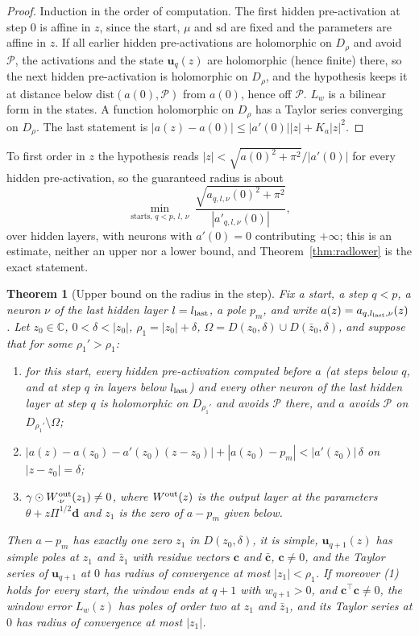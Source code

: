 \documentclass[11pt]{article}
\newtheorem{theorem}{Theorem}
\theoremstyle{definition}
\theoremstyle{remark}
\newcommand{\uu}{\mathbf{u}}
\begin{document}
\begin{proof}
Induction in the order of computation. The first hidden pre-activation at step $0$ is affine in $z$, since the start, $\mu$ and $\mathrm{sd}$ are fixed and the parameters are affine in $z$. If all earlier hidden pre-activations are holomorphic on $D_\rho$ and avoid $\mathcal P$, the activations and the state $\uu_q(z)$ are holomorphic (hence finite) there, so the next hidden pre-activation is holomorphic on $D_\rho$, and the hypothesis keeps it at distance below $\mathrm{dist}(a(0),\mathcal P)$ from $a(0)$, hence off $\mathcal P$. $L_w$ is a bilinear form in the states. A function holomorphic on $D_\rho$ has a Taylor series converging on $D_\rho$. The last statement is $|a(z)-a(0)|\le|a'(0)||z|+K_a|z|^2$.
\end{proof}

To first order in $z$ the hypothesis reads $|z|<\sqrt{a(0)^2+\pi^2}/|a'(0)|$ for every hidden pre-activation, so the guaranteed radius is about
\begin{equation}\label{eq:radest}
\min_{\text{starts},\,q<p,\,l,\,\nu}\ \frac{\sqrt{a_{q,l,\nu}(0)^2+\pi^2}}{|a'_{q,l,\nu}(0)|},
\end{equation}
over hidden layers, with neurons with $a'(0)=0$ contributing $+\infty$; this is an estimate, neither an upper nor a lower bound, and Theorem~\ref{thm:radlower} is the exact statement.

\begin{theorem}[Upper bound on the radius in the step]\label{thm:radupper}
Fix a start, a step $q<p$, a neuron $\nu$ of the last hidden layer $l=l_{\rm last}$, a pole $p_m$, and write $a(z)=a_{q,l_{\rm last},\nu}(z)$. Let $z_0\in\mathbb C$, $0<\delta<|z_0|$, $\rho_1=|z_0|+\delta$, $\Omega=D(z_0,\delta)\cup D(\bar z_0,\delta)$, and suppose that for some $\rho_1'>\rho_1$:
\begin{enumerate}
\item for this start, every hidden pre-activation computed before $a$ (at steps below $q$, and at step $q$ in layers below $l_{\rm last}$) and every other neuron of the last hidden layer at step $q$ is holomorphic on $D_{\rho_1'}$ and avoids $\mathcal P$ there, and $a$ avoids $\mathcal P$ on $D_{\rho_1'}\setminus\Omega$;
\item $|a(z)-a(z_0)-a'(z_0)(z-z_0)|+|a(z_0)-p_m|<|a'(z_0)|\,\delta$ on $|z-z_0|=\delta$;
\item $\gamma\odot W^{\rm out}_{\cdot\nu}(z_1)\ne0$, where $W^{\rm out}(z)$ is the output layer at the parameters $\theta+z\Pi^{1/2}\mathbf d$ and $z_1$ is the zero of $a-p_m$ given below.
\end{enumerate}
Then $a-p_m$ has exactly one zero $z_1$ in $D(z_0,\delta)$, it is simple, $\uu_{q+1}(z)$ has simple poles at $z_1$ and $\bar z_1$ with residue vectors $\mathbf c$ and $\bar{\mathbf c}$, $\mathbf c\ne0$, and the Taylor series of $\uu_{q+1}$ at $0$ has radius of convergence at most $|z_1|<\rho_1$.
If moreover (1) holds for every start, the window ends at $q+1$ with $w_{q+1}>0$, and $\mathbf c^\top\mathbf c\ne0$, the window error $L_w(z)$ has poles of order two at $z_1$ and $\bar z_1$, and its Taylor series at $0$ has radius of convergence at most $|z_1|$.
\end{theorem}
\end{document}
